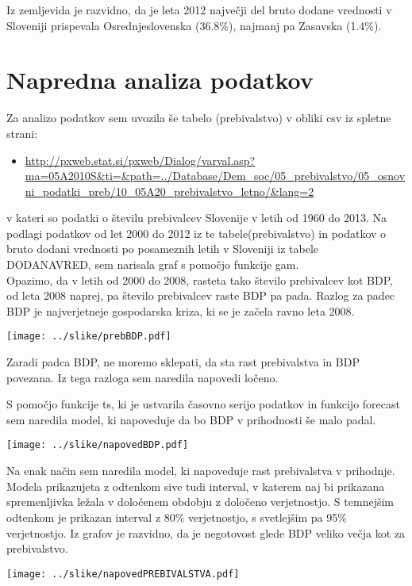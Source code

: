 \documentclass[a4paper, 11pt]{article}
\begin{document}
Iz zemljevida je razvidno, da je leta 2012 največji del bruto dodane vrednosti v Sloveniji prispevala Osrednjeslovenska (36.8\%), najmanj pa Zasavska (1.4\%).


\section{Napredna analiza podatkov}

Za analizo podatkov sem uvozila še tabelo (prebivalstvo) v obliki csv iz spletne strani:
\begin{itemize}
\item{\url{http://pxweb.stat.si/pxweb/Dialog/varval.asp?ma=05A2010S&ti=&path=../Database/Dem_soc/05_prebivalstvo/05_osnovni_podatki_preb/10_05A20_prebivalstvo_letno/&lang=2}}
\end{itemize}
v kateri so podatki o številu prebivalcev Slovenije v letih od 1960 do 2013.
Na podlagi podatkov od let 2000 do 2012 iz te tabele(prebivalstvo) in podatkov o bruto dodani vrednosti po posameznih letih v Sloveniji iz tabele DODANAVRED, sem narisala graf s pomočjo funkcije gam. \\
Opazimo, da v letih od 2000 do 2008, rasteta tako število prebivalcev kot BDP, od leta 2008 naprej, pa število prebivalcev raste BDP pa pada. Razlog za padec BDP je najverjetneje gospodarska kriza, ki se je začela ravno leta 2008.

\texttt{[image: ../slike/prebBDP.pdf]}

Zaradi padca BDP, ne moremo sklepati, da sta rast prebivalstva in BDP povezana. Iz tega razloga sem naredila napovedi ločeno.

S pomočjo funkcije ts, ki je ustvarila časovno serijo podatkov in funkcijo forecast sem naredila model, ki napoveduje da bo BDP v prihodnosti še malo padal.\\

\newpage
\begin{center}
\texttt{[image: ../slike/napovedBDP.pdf]}
\end{center}
Na enak način sem naredila model, ki napoveduje
rast prebivalstva v prihodnje. \\
Modela prikazujeta z odtenkom sive tudi interval, v katerem naj bi prikazana spremenljivka ležala v določenem obdobju z določeno verjetnostjo. S temnejšim odtenkom je prikazan interval z 80\% verjetnostjo, s svetlejšim pa 95\% verjetnostjo. Iz grafov je razvidno, da je negotovost glede BDP veliko večja kot za prebivalstvo.

\newpage
\begin{center}
\texttt{[image: ../slike/napovedPREBIVALSTVA.pdf]}
\end{center} 
\end{document}
